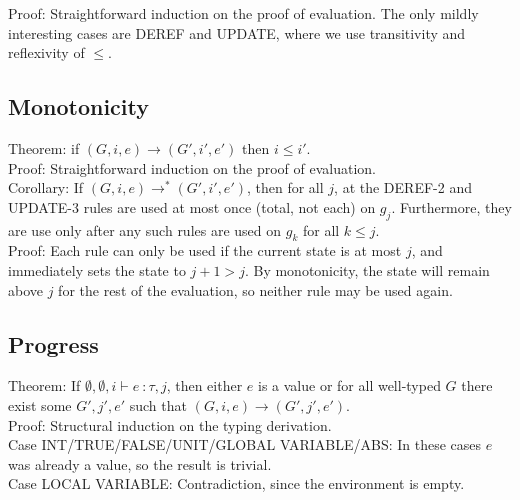 \documentclass{article}
\begin{document}
\noindent Proof: Straightforward induction on the proof of evaluation. The only mildly interesting cases are DEREF and UPDATE, where we use transitivity and reflexivity of $\leq$.

\subsection*{Monotonicity}
Theorem: if $(G, i, e) \rightarrow (G', i', e')$ then $i \leq i'$.
\\

\noindent Proof: Straightforward induction on the proof of evaluation.
\\

\noindent Corollary: If $(G, i, e) \rightarrow^* (G', i', e')$, then for all $j$, at the DEREF-2 and UPDATE-3 rules are used at most once (total, not each) on $g_j$. Furthermore, they are use only after any such rules are used on $g_k$ for all $k \leq j$.
\\

\noindent Proof: Each rule can only be used if the current state is at most $j$, and immediately sets the state to $j+1 > j$. By monotonicity, the state will remain above $j$ for the rest of the evaluation, so neither rule may be used again.

\subsection*{Progress}
Theorem: If $\emptyset, \emptyset, i \vdash e\ \colon \tau, j$, then either $e$ is a value or for all well-typed $G$ there exist some $G', j', e'$ such that $(G, i, e) \rightarrow (G', j', e')$.
\\

\noindent Proof: Structural induction on the typing derivation.
\\

Case INT/TRUE/FALSE/UNIT/GLOBAL VARIABLE/ABS: In these cases $e$ was already a value, so the result is trivial.
\\

Case LOCAL VARIABLE: Contradiction, since the environment is empty.
\\
\end{document}
